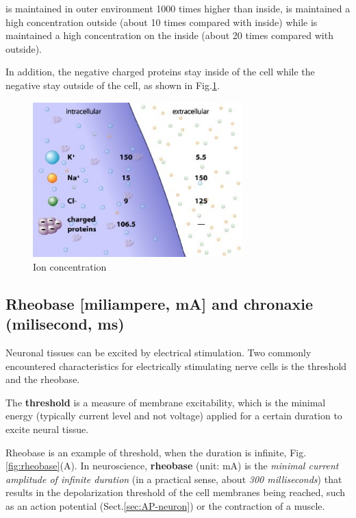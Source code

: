  is maintained in outer environment 1000 times higher than
inside,  is maintained a high concentration outside (about 10 times
compared with inside) while  is maintained a high concentration on the
inside (about 20 times compared with outside).

In addition, the negative charged proteins stay inside of the cell while
the negative  stay outside of the cell, as shown in
Fig.\ref{fig:ion-concentration}. 
 
\begin{figure}[htb]
  \centerline{\includegraphics[height=6cm]{./images/ions-concentration.eps}}
  \caption{Ion concentration}\label{fig:ion-concentration}
\end{figure}



\subsection{Rheobase [miliampere, mA] and chronaxie (milisecond, ms)}
\label{sec:rheobase}

Neuronal tissues can be excited by electrical stimulation. Two commonly
encountered characteristics for electrically stimulating nerve cells is the
threshold and the rheobase.

The {\bf threshold} is a measure of membrane excitability, which is the minimal
energy (typically current level and not voltage) applied for a certain duration
to excite neural tissue.

Rheobase is an example of threshold, when the duration is infinite,
Fig.\ref{fig:rheobase}(A).
In neuroscience, {\bf rheobase} (unit: mA) is the {\it minimal current amplitude
of infinite duration} (in a practical sense, about {\it 300 milliseconds}) that
results in the depolarization threshold of the cell membranes being reached,
such as an action potential (Sect.\ref{sec:AP-neuron}) or the contraction of a
muscle.

